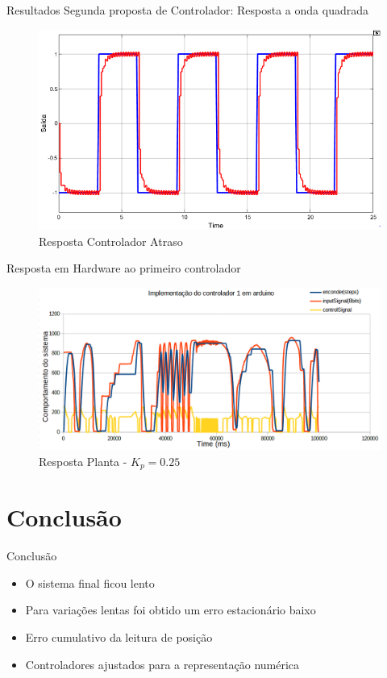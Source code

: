 \documentclass{beamer}
\begin{document}
\begin{frame}{Resultados Segunda proposta de Controlador: Resposta a onda quadrada}
\begin{figure}
    \centering
    \includegraphics[width = \linewidth]{src/tex/img/teste_square.PNG}
    \caption{Resposta Controlador Atraso}
    \label{fig:controler2}
\end{figure}
\end{frame}

\begin{frame}{Resposta em Hardware ao primeiro controlador}
\begin{figure}
    \centering
    \includegraphics[width = \linewidth]{src/tex/img/resultado_controle_1_implem.PNG}
    \caption{Resposta Planta - $K_p = 0.25$}
    \label{fig:control_1}
\end{figure}
\end{frame}

\section{Conclusão}

\begin{frame}{Conclusão}
\begin{itemize}
    \item O sistema final ficou lento
    \item Para variações lentas foi obtido um erro estacionário baixo
    \item Erro cumulativo da leitura de posição
    \item Controladores ajustados para a representação numérica
\end{itemize}
\end{frame}
\end{document}
